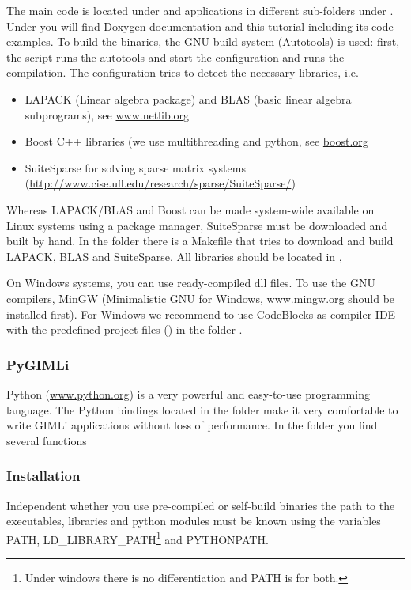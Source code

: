 The main code is located under  and applications in different sub-folders under .
Under  you will find Doxygen documentation and this tutorial including its code examples.
To build the binaries, the GNU build system (Autotools) is used: first, the script  runs the autotools and start the configuration  and  runs the compilation.
The configuration tries to detect the necessary libraries, i.e. 
\begin{itemize}
	\item LAPACK (Linear algebra package) and BLAS (basic linear algebra subprograms), see \url{www.netlib.org}
	\item Boost C++ libraries (we use multithreading and python, see \url{boost.org}
	\item SuiteSparse for solving sparse matrix systems (\url{http://www.cise.ufl.edu/research/sparse/SuiteSparse/})
\end{itemize}
Whereas LAPACK/BLAS and Boost can be made system-wide available on Linux systems using a package manager, SuiteSparse must be downloaded and built by hand. 
In the folder  there is a Makefile that tries to download and build LAPACK, BLAS and SuiteSparse.
All libraries should be located in , 

On Windows systems, you can use ready-compiled dll files.
To use the GNU compilers, MinGW (Minimalistic GNU for Windows, \url{www.mingw.org} should be installed first).
For Windows we recommend to use CodeBlocks as compiler IDE with the predefined project files () in the folder .

\subsubsection*{PyGIMLi}
Python (\url{www.python.org}) is a very powerful and easy-to-use programming language.
The Python bindings located in the folder  make it very comfortable to write GIMLi applications without loss of performance.
In the folder  you find several functions

\subsubsection*{Installation}
Independent whether you use pre-compiled or self-build binaries the path to the executables, libraries and python modules must be known using the variables PATH, LD\_LIBRARY\_PATH\footnote{Under windows there is no differentiation and PATH is for both.} and PYTHONPATH.

